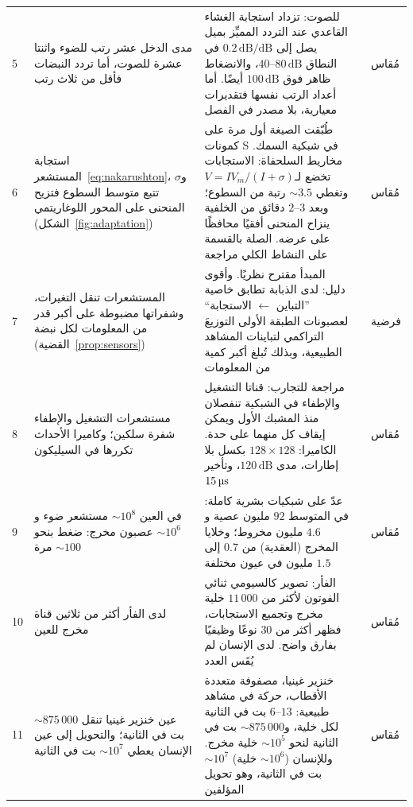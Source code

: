 {\begin{longtable}{>{\raggedright}p{0.5cm}>{\raggedright}p{4.0cm}>{\raggedright}p{5.6cm}>{\raggedright}p{2.3cm}>{\raggedright\arraybackslash}p{1.7cm}}
5 & مدى الدخل عشر رتب للضوء واثنتا عشرة للصوت، أما تردد النبضات فأقل من ثلاث رتب & للصوت: تزداد استجابة الغشاء القاعدي عند التردد المميِّز بميل يصل إلى $0.2\,\text{dB/dB}$ في النطاق $40\text{--}80\,\text{dB}$، والانضغاط ظاهر فوق $100\,\text{dB}$ أيضًا. أما أعداد الرتب نفسها فتقديرات معيارية، بلا مصدر في الفصل & \cite{Ruggero1997} & مُقاس \\
6 & استجابة المستشعر~\eqref{eq:nakarushton}، و$\sigma$ تتبع متوسط السطوع فتزيح المنحنى على المحور اللوغاريتمي (الشكل~\ref{fig:adaptation}) & طُبّقت الصيغة أول مرة على كمونات \foreignlanguage{english}{S} في شبكية السمك. مخاريط السلحفاة: الاستجابات تخضع لـ$V=I V_m/(I+\sigma)$ وتغطي $\sim3.5$ رتبة من السطوع؛ وبعد $2\text{--}3$ دقائق من الخلفية ينزاح المنحنى أفقيًا محافظًا على عرضه. الصلة بالقسمة على النشاط الكلي مراجعة & \cite{NakaRushton1966,NormannPerlman1979,Carandini2012} & مُقاس \\
7 & المستشعرات تنقل التغيرات، وشفراتها مضبوطة على أكبر قدر من المعلومات لكل نبضة (القضية~\ref{prop:sensors}) & المبدأ مقترح نظريًا. وأقوى دليل: لدى الذبابة تطابق خاصية ”التباين $\leftarrow$ الاستجابة“ لعصبونات الطبقة الأولى التوزيعَ التراكمي لتباينات المشاهد الطبيعية، وبذلك تُبلغ أكبر كمية من المعلومات & \cite{Barlow1961,Laughlin1981} & فرضية \\
8 & مستشعرات التشغيل والإطفاء شفرة سلكين؛ وكاميرا الأحداث تكررها في السيليكون & مراجعة للتجارب: قناتا التشغيل والإطفاء في الشبكية تنفصلان منذ المشبك الأول ويمكن إيقاف كل منهما على حدة. الكاميرا: $128\times128$ بكسل بلا إطارات، مدى $120\,\text{dB}$، وتأخير $15\,\text{\textmu s}$ & \cite{Schiller1992,Lichtsteiner2008,Gallego2022} & مُقاس \\
9 & في العين $\sim10^8$ مستشعر ضوء و$\sim10^6$ عصبون مخرج: ضغط بنحو $\sim100$ مرة & عدّ على شبكيات بشرية كاملة: في المتوسط $92$ مليون عصية و$4.6$ مليون مخروط؛ وخلايا المخرج (العقدية) من $0.7$ إلى $1.5$ مليون في عيون مختلفة & \cite{Curcio1990,CurcioAllen1990} & مُقاس \\
10 & لدى الفأر أكثر من ثلاثين قناة مخرج للعين & الفأر: تصوير كالسيومي ثنائي الفوتون لأكثر من $11\,000$ خلية مخرج وتجميع الاستجابات، فظهر أكثر من $30$ نوعًا وظيفيًا بفارق واضح. لدى الإنسان لم يُقَس العدد & \cite{Baden2016} & مُقاس \\
11 & عين خنزير غينيا تنقل $\sim875\,000$ بت في الثانية؛ والتحويل إلى عين الإنسان يعطي $\sim10^7$ بت في الثانية & خنزير غينيا، مصفوفة متعددة الأقطاب، حركة في مشاهد طبيعية: $6\text{--}13$ بت في الثانية لكل خلية، و$\sim875\,000$ بت في الثانية لنحو $\sim10^5$ خلية مخرج. وللإنسان ($\sim10^6$ خلية) $\sim10^7$ بت في الثانية، وهو تحويل المؤلفين & \cite{Koch2006} & مُقاس \\

\end{longtable}}
